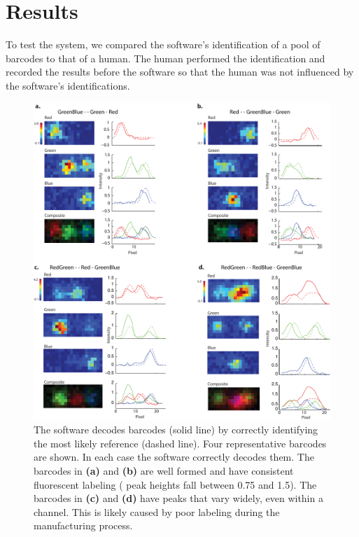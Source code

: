 \section{Results} \label{sec:thoeryResults}
To test the system, we compared the software's identification of a pool of barcodes to that of a human. The human performed the identification and recorded the results before the software so that the human was not influenced by the software's identifications. 

\begin{figure}[htbp]
\begin{center}
	\includegraphics[width=\textwidth]{figures/theoryFittedBarcodes}
	\caption{The software decodes barcodes (solid line) by correctly identifying the most likely reference (dashed line). Four representative barcodes are shown. In each case the software correctly decodes them. The barcodes in \textbf{(a)} and  \textbf{(b)} are well formed and have consistent fluorescent labeling ( peak heights fall between 0.75 and 1.5). The barcodes in \textbf{(c)} and  \textbf{(d)} have peaks that vary widely, even within a channel. This is likely caused by poor labeling during the manufacturing process. \label{fig:fittedBarcodes}}
\end{center}	
\end{figure}

